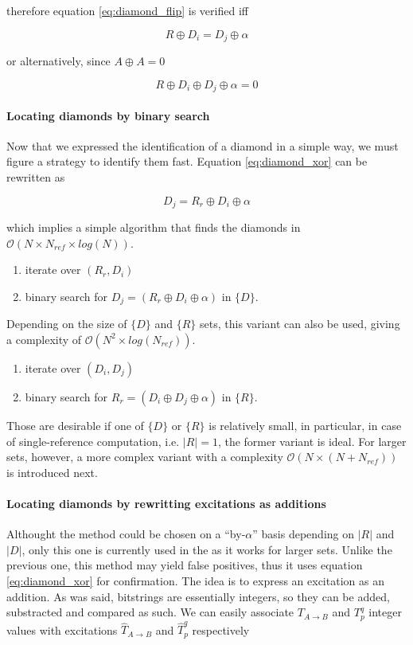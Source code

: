\documentclass[./thesis.tex]{subfiles}
\begin{document}
therefore equation \ref{eq:diamond_flip} is verified iff

\begin{equation}
R \oplus D_i = D_j \oplus \alpha
\end{equation}

or alternatively, since $A \oplus A = 0$

\begin{equation}
R \oplus D_i \oplus D_j \oplus \alpha = 0
\label{eq:diamond_xor}
\end{equation}

\paragraph{Locating diamonds by binary search}
Now that we expressed the identification of a diamond in a simple way, we must figure a strategy to identify them fast. Equation \ref{eq:diamond_xor} can be rewritten as

\begin{equation}
D_j = R_r \oplus D_i \oplus \alpha
\end{equation}

which implies a simple algorithm that finds the diamonds in $\mathcal{O}(N \times N_{ref} \times log(N))$.
\begin{enumerate}
\item
iterate over $(R_r, D_i)$
\item
binary search for $D_j = (R_r \oplus D_i \oplus \alpha)$ in $\{D\}$. 
\end{enumerate}

Depending on the size of $\{D\}$ and $\{R\}$ sets, this variant can also be used, giving a complexity of $\mathcal{O}(N^2 \times log(N_{ref}))$.

\begin{enumerate}
\item
iterate over $(D_i, D_j)$
\item
binary search for $R_r = (D_i \oplus D_j \oplus \alpha)$ in $\{R\}$. 
\end{enumerate}

Those are desirable if one of $\{D\}$ or $\{R\}$ is relatively small, in particular, in case of single-reference computation, i.e. $|R|=1$, the former variant is ideal. For larger sets, however, a more complex variant with a complexity $\mathcal{O}(N \times (N+N_{ref}))$ is introduced next.


\paragraph{Locating diamonds by rewritting excitations as additions}
Althought the method could be chosen on a ``by-$\alpha$'' basis depending on $|R|$ and $|D|$, only this one is currently used in the \QP as it works for larger sets.
Unlike the previous one, this method may yield false positives, thus it uses equation \ref{eq:diamond_xor} for confirmation.
The idea is to express an excitation as an addition. As was said, bitstrings are essentially integers, so they can be added, substracted and compared as such. We can easily associate $T_{A \rightarrow B}$ and $T_p^q$ integer values with  excitations $\hat T_{A \rightarrow B}$ and $\hat T_p^q$ respectively
\end{document}

